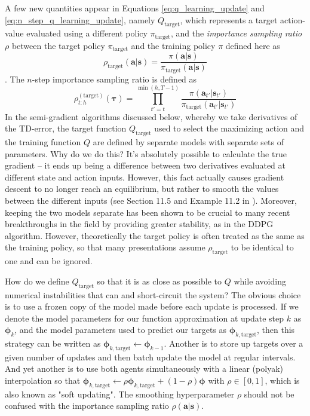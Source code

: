 \documentclass{article}
\begin{document}
A few new quantities appear in Equations \ref{eq:q_learning_update} and \ref{eq:n_step_q_learning_update}, namely $Q_\text{target}$, which represents a target action-value evaluated using a different policy $\pi_\text{target}$, and the \textit{importance sampling ratio} $\rho$ between the target policy $\pi_\text{target}$ and the training policy $\pi$ defined here as \begin{equation}\rho_\text{target}(\mathbf{a}|\mathbf{s})=\frac{\pi(\mathbf{a}|\mathbf{s})}{\pi_\text{target}(\mathbf{a}|\mathbf{s})}\end{equation}. The $n$-step importance sampling ratio is defined as \begin{equation}\rho^{(\text{target})}_{t:h}(\boldsymbol{\tau})=\prod_{t'=t}^{\min(h,T-1)}\frac{\pi(\mathbf{a}_{t'}|\mathbf{s}_{t'})}{\pi_\text{target}(\mathbf{a}_{t'}|\mathbf{s}_{t'})}\end{equation}
In the semi-gradient algorithms discussed below, whereby we take derivatives of the TD-error, the target function  $Q_\text{target}$ used to select the maximizing action and the training function  $Q$ are defined by separate models with separate sets of parameters. Why do we do this? It's absolutely possible to calculate the true gradient -- it ends up being a difference between two derivatives evaluated at different state and action inputs. However, this fact actually causes gradient descent to no longer reach an equilibrium, but rather to smooth the values between the different inputs (see Section 11.5 and Example 11.2 in \cite{sutton_barto_rl}). Moreover, keeping the two models separate has been shown to be crucial to many recent breakthroughs in the field by providing greater stability, as in the DDPG algorithm\cite{DDPG}. However, theoretically the target policy is often treated as the same as the training policy, so that many presentations assume $\rho_{\text{target}}$ to be identical to one and can be ignored.

How do we define $Q_\text{target}$ so that it is as close as possible to $Q$ while avoiding numerical instabilities that can and short-circuit the system? The obvious choice is to use a frozen copy of the model made before each update is processed. If we denote the model parameters for our function approximation at update step $k$  as $\boldsymbol{\phi}_k$, and the model parameters used to predict our targets as  $\boldsymbol{\phi}_{k,\text{target}}$, then this strategy can be written as $\boldsymbol{\phi}_{k,\text{target}}\leftarrow\boldsymbol{\phi}_{k-1}$.  Another is to store up targets over a given number of updates and then batch update the model at regular intervals. And yet another is to use both agents simultaneously with a linear (polyak) interpolation so that $\boldsymbol{\phi}_{k,\text{target}}\leftarrow \rho\boldsymbol{\phi}_{k,\text{target}}+(1-\rho)\boldsymbol{\phi}$ with $\rho\in[0,1]$, which is also known as "soft updating". The smoothing hyperparameter $\rho$ should not be confused with the importance sampling ratio $\rho(\mathbf{a}|\mathbf{s})$.
\end{document}
